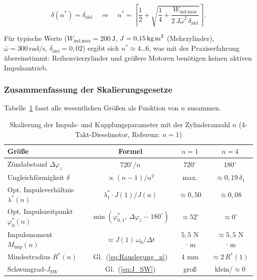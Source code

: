 ﻿\documentclass[a4paper,12pt]{article}
\begin{document}
\begin{equation}
  \delta(n^*) = \delta_\text{ziel}
  \quad\Longrightarrow\quad
  n^* = \left\lceil \frac{1}{2} +
    \sqrt{\frac{1}{4} + \frac{W_\text{ind,max}}{2\,J\bar{\omega}^2\,\delta_\text{ziel}}}
  \right\rceil.
  \label{eq:n_stern}
\end{equation}

Für typische Werte ($W_\text{ind,max} = 200\,\text{J}$,
$J = 0{,}15\,\text{kg\,m}^2$ (Mehrzylinder), $\bar\omega = 300\,\text{rad/s}$,
$\delta_\text{ziel} = 0{,}02$) ergibt sich $n^* \approx 4$\ldots$6$, was mit
der Praxiserfahrung übereinstimmt: Reihenvierzylinder und größere Motoren
benötigen keinen aktiven Impulsantrieb.

\subsubsection*{Zusammenfassung der Skalierungsgesetze}

Tabelle~\ref{tab:skalierung_n} fasst alle wesentlichen Größen als Funktion
von $n$ zusammen.

\begin{table}[h]
\centering
\caption{Skalierung der Impuls- und Kupplungsparameter mit der Zylinderanzahl $n$
(4-Takt-Dieselmotor, Referenz: $n=1$)}
\label{tab:skalierung_n}
\begin{tabular}{lccc}
\toprule
\textbf{Größe} & \textbf{Formel} & $n=1$ & $n=4$ \\
\midrule
Zündabstand $\Delta\varphi_z$ & $720^\circ/n$ & $720^\circ$ & $180^\circ$ \\
Ungleichförmigkeit $\delta$ & $\propto (n-1)/n^2$ & max. & $\approx 0{,}19\,\delta_1$ \\
Opt. Impulsverhältnis $\lambda^*(n)$ & $\lambda^*_1 \cdot J(1)/J(n)$ & $\approx 0{,}50$ & $\approx 0{,}08$ \\
Opt. Impulszeitpunkt $\varphi_0^*(n)$ & $\min(\varphi_{0,1}^*,\, \Delta\varphi_z - 180^\circ)$ & $\approx 52^\circ$ & $\approx 0^\circ$ \\
Impulsmoment $M_\text{imp}(n)$ & $\approx J(1)\,\omega_0/\Delta t$ & $5{,}5$ N ·m & $\approx 5{,}5$ N ·m \\
Mindestradius $R^*(n)$ & Gl.~(\ref{eq:Rauslegung_n}) & 4 mm & $\approx 2\,R^*(1)$ \\
Schwungrad-$J_\text{SW}$ & Gl.~(\ref{eq:J_SW}) & groß & klein/$\approx 0$ \\
\bottomrule
\end{tabular}
\end{table}
\end{document}
